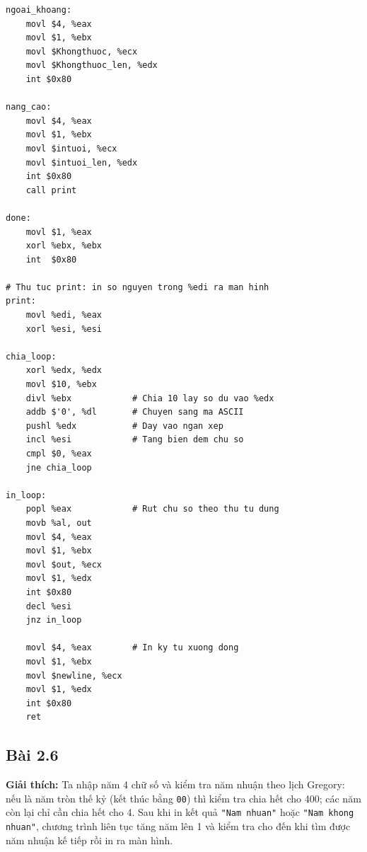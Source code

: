 \documentclass[12pt,a4paper]{article}
\begin{document}
\begin{lstlisting}
ngoai_khoang:
	movl $4, %eax
	movl $1, %ebx
	movl $Khongthuoc, %ecx
	movl $Khongthuoc_len, %edx
	int $0x80

nang_cao:
	movl $4, %eax
	movl $1, %ebx
	movl $intuoi, %ecx
	movl $intuoi_len, %edx
	int $0x80
	call print

done:
	movl $1, %eax
	xorl %ebx, %ebx
	int  $0x80

# Thu tuc print: in so nguyen trong %edi ra man hinh
print:
	movl %edi, %eax
	xorl %esi, %esi

chia_loop:
	xorl %edx, %edx
	movl $10, %ebx
	divl %ebx            # Chia 10 lay so du vao %edx
	addb $'0', %dl       # Chuyen sang ma ASCII
	pushl %edx           # Day vao ngan xep
	incl %esi            # Tang bien dem chu so
	cmpl $0, %eax
	jne chia_loop

in_loop:
	popl %eax            # Rut chu so theo thu tu dung
	movb %al, out
	movl $4, %eax
	movl $1, %ebx
	movl $out, %ecx
	movl $1, %edx
	int $0x80
	decl %esi
	jnz in_loop

	movl $4, %eax        # In ky tu xuong dong
	movl $1, %ebx
	movl $newline, %ecx
	movl $1, %edx
	int $0x80
	ret
\end{lstlisting}

\subsection{Bài 2.6}

\textbf{Giải thích:}
Ta nhập năm 4 chữ số và kiểm tra năm nhuận theo lịch Gregory: nếu là năm tròn thế kỷ (kết thúc bằng \texttt{00}) thì kiểm tra chia hết cho 400; các năm còn lại chỉ cần chia hết cho 4. Sau khi in kết quả \texttt{"Nam nhuan"} hoặc \texttt{"Nam khong nhuan"}, chương trình liên tục tăng năm lên 1 và kiểm tra cho đến khi tìm được năm nhuận kế tiếp rồi in ra màn hình.
\end{document}
